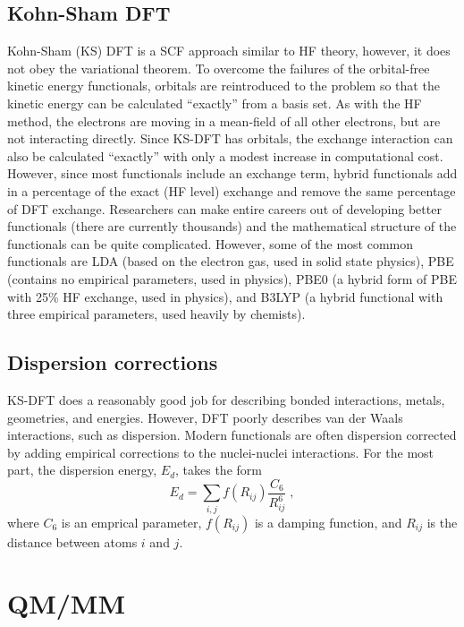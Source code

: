 \documentclass[12pt]{report}
\begin{document}
\subsection{Kohn-Sham DFT}

Kohn-Sham (KS) DFT is a SCF approach similar to HF theory, however, it does
not obey the variational theorem.
To overcome the failures of the orbital-free kinetic energy functionals,
orbitals are reintroduced to the problem so that the kinetic energy can be
calculated ``exactly'' from a basis set.
As with the HF method, the electrons are moving in a mean-field of all other
electrons, but are not interacting directly.
Since KS-DFT has orbitals, the exchange interaction can also be calculated
``exactly'' with only a modest increase in computational cost.
However, since most functionals include an exchange term, hybrid functionals
add in a percentage of the exact (HF level) exchange and remove the same
percentage of DFT exchange.
Researchers can make entire careers out of developing better functionals
(there are currently thousands) and the mathematical structure of the
functionals can be quite complicated.
However, some of the most common functionals are LDA (based on the electron
gas, used in solid state physics), PBE (contains no empirical parameters, used
in physics), PBE0 (a hybrid form of PBE with 25\% HF exchange, used in
physics), and B3LYP (a hybrid functional with three empirical parameters, used
heavily by chemists).

\subsection{Dispersion corrections}

KS-DFT does a reasonably good job for describing bonded interactions, metals,
geometries, and energies.
However, DFT poorly describes van der Waals interactions, such as dispersion.
Modern functionals are often dispersion corrected by adding empirical
corrections to the nuclei-nuclei interactions.
For the most part, the dispersion energy, $E_d$, takes the form
\begin{equation}
 E_d = \sum_{i,j} f(R_{ij})\frac{C_6}{R_{ij}^6} \; ,
\end{equation}
where $C_6$ is an emprical parameter, $f(R_{ij})$ is a damping function, and
$R_{ij}$ is the distance between atoms $i$ and $j$.

\section{QM/MM}
 \label{sec:QMMMSim}
\end{document}
